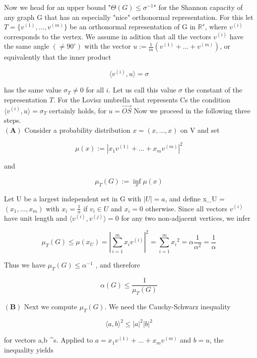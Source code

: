 \documentclass[openany,12pt]{memoir}
\newcommand{\setnewpagemargins}{
    \clearpage
    \setulmarginsandblock{2cm}{0.5cm}{*}
    \checkandfixthelayout
}
\begin{document}

\setnewpagemargins

Now we head for an upper bound "$\Theta(G) \leq \sigma^{-1}$" for the Shannon capacity
of any graph G that has an especially "nice" orthonormal representation.
For this let $T = \{v^{(1)},\ldots,v^{(m)}\}$ be an orthonormal representation 
of G in $\mathbb{R}^{s}$, where $v^{(i)}$ corresponds to the vertex. We assume in
adition that all the vectors $v^{(i)}$ have the same angle $(\neq 90^{\circ})$ with the
vector $u := {\frac{1}{m}}(v^{(1)}+\ldots+v^{(m)})$, or equivalently that the inner product 

\[
 \langle v^{(i)}, u\rangle  = \sigma 
\]

 has the same value $\sigma_T \neq 0$ for all $i$. Let us call this value $\sigma$ the constant
of the representation $T$. For the Lovisz umbrella that represents Cs the 
condition $\langle v^{(i)},u \rangle = \sigma_T$ certainly holds, for $u = \overrightarrow{OS}$
Now we proceed in the following three steps.\\
$\mathbf{(A)}$ Consider a probability distribution $x = (x,\ldots, x)$ on V and set

\[
\mu(x) := |x_1v^{(1)}+\ldots+x_mv^{(m)}|^{2}
\]

and

\[
{\mu_{T}}(G) := \underset{x}{\inf}\mu(x)
\]

Let U be a largest independent set in G with $|U| = a$, and define x_U =\\
$(x_1,\ldots,x_m)$ with $x_i = {\frac{1}{\alpha}}$ if $v_i\in U$ and $x_i = 0$  otherwise. Since all 
vectors $v^{(i)}$  have unit length and $\langle v^{(i)}, v^{(j)} \rangle = 0$ for any two non-adjacent 
vertices, we infer

\[
    \mu_T(G)\leq\mu(x_U)=|\sum_{i=1}^{m}x_iv^{(i)}|^2= \sum_{i=1}^{m} {x_i}^2 = \alpha {\frac{1}{\alpha^{2}}} = {\frac{1}{\alpha}}
\]

Thus we have $\mu_{T}(G) \leq \alpha^{-1}$ , and therefore

\[
    \alpha(G) \leq {\frac{1}{\mu_{T}(G)}}
\]

$\mathbf{(B)}$ Next we compute ${\mu_T}(G)$. We need the Cauchy-Schwarz inequality

\[
\langle a,b \rangle^2 \leq |a|^2 |b|^2
\]

for vectors a,b \in {}^s. Applied to $a = x_{1}v^{(1)}+\ldots+x_{m}v^{(m)}$ and $b=u$,
the inequality yields
\end{document}
